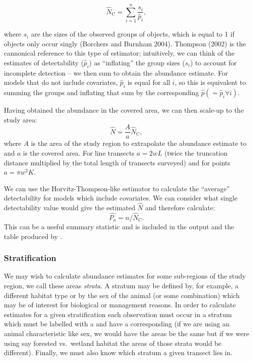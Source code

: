 \documentclass[article]{jss}
\begin{document}
\begin{equation}
\hat{N}_\text{C} = \sum_{i=1}^n\frac{s_i}{\hat{p}_i},
\label{ht}
\end{equation}

where \(s_i\) are the sizes of the observed groups of objects, which is
equal to 1 if objects only occur singly (Borchers and Burnham 2004).
Thompson (2002) is the cannonical reference to this type of estimator;
intuitively, we can think of the estimates of detectability
(\(\hat{p}_i\)) as ``inflating'' the group sizes (\(s_i\)) to account
for incomplete detection -- we then sum to obtain the abundance
estimate. For models that do not include covariates, \(\hat{p}_i\) is
equal for all \(i\), so this is equivalent to summing the groups and
inflating that sum by the corresponding
\(\hat{p} (=\hat{p}_i \forall i)\).

Having obtained the abundance in the covered area, we can then scale-up
to the study area: \[
\hat{N} = \frac{A}{a} \hat{N}_\text{C},
\] where \(A\) is the area of the study region to extrapolate the
abundance estimate to and \(a\) is the covered area. For line transects
\(a=2wL\) (twice the truncation distance multiplied by the total length
of transects surveyed) and for points \(a=\pi w^2 K\).

We can use the Horvitz-Thompson-like estimator to calculate the
``average'' detectability for models which include covariates. We can
consider what single detectability value would give the estimated
\(\hat{N}\) and therefore calculate: \[
\hat{P_a} = n/\hat{N}_\text{C}.
\] This can be a useful summary statistic and is included in the
 output and the table produced by
.

\subsubsection{Stratification}\label{stratification}

We may wish to calculate abundance estimates for some sub-regions of the
study region, we call these areas \emph{strata}. A stratum may be
defined by, for example, a different habitat type or by the sex of the
animal (or some combination) which may be of interest for biological or
management reasons. In order to calculate estimates for a given
stratification each observation must occur in a stratum which must be
labelled with a  and have a corresponding 
(if we are using an animal characteristic like sex, we would have the
areas be the same but if we were using say forested vs.~wetland habitat
the areas of those strata would be different). Finally, we must also
know which stratum a given transect lies in.
\end{document}
